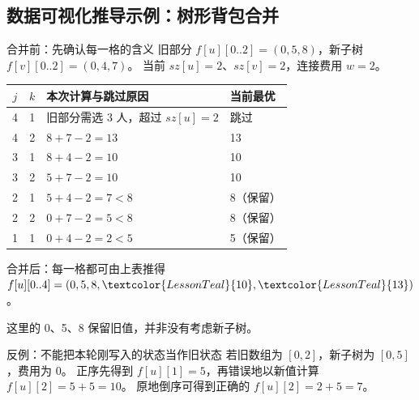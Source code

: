 \subsection{数据可视化推导示例：树形背包合并}
\begin{lessonblue}{合并前：先确认每一格的含义}
旧部分 \(f[u][0..2]=(0,5,8)\)，新子树 \(f[v][0..2]=(0,4,7)\)。
当前 \(sz[u]=2\)、\(sz[v]=2\)，连接费用 \(w=2\)。
\end{lessonblue}
\begin{center}
\end{center}
\begin{center}
\small
\begin{tabularx}{\linewidth}{@{}c c X l@{}}
\toprule
$j$ & $k$ & 本次计算与跳过原因 & 当前最优\\\midrule
4 & 1 & 旧部分需选 3 人，超过 $sz[u]=2$ & 跳过\\
4 & 2 & $8+7-2=13$ & \textcolor{LessonTeal}{13}\\
3 & 1 & $8+4-2=10$ & \textcolor{LessonTeal}{10}\\
3 & 2 & $5+7-2=10$ & 10\\
2 & 1 & $5+4-2=7<8$ & 8（保留）\\
2 & 2 & $0+7-2=5<8$ & 8（保留）\\
1 & 1 & $0+4-2=2<5$ & 5（保留）\\
\bottomrule
\end{tabularx}
\end{center}
\begin{lessonteal}{合并后：每一格都可由上表推得}
\centering \(f[u][0..4]=(0,5,8,\textcolor{LessonTeal}{10},\textcolor{LessonTeal}{13})\)。

这里的 0、5、8 保留旧值，并非没有考虑新子树。
\end{lessonteal}
\begin{lessonred}{反例：不能把本轮刚写入的状态当作旧状态}
若旧数组为 $[0,2]$，新子树为 $[0,5]$，费用为 0。
正序先得到 $f[u][1]=5$，再错误地以新值计算 $f[u][2]=5+5=10$。
原地倒序可得到正确的 $f[u][2]=2+5=7$。
\end{lessonred}
